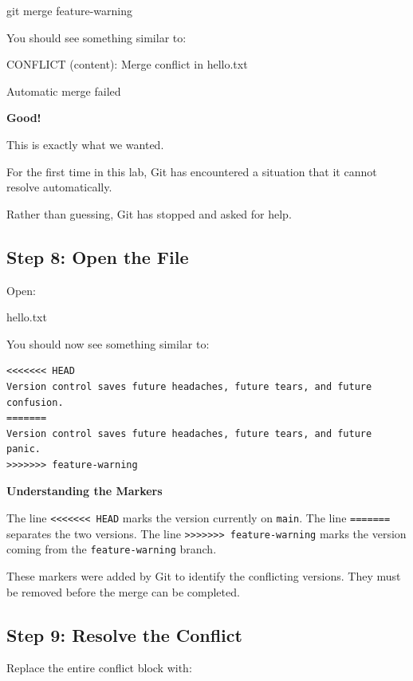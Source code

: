 \documentclass{csc2059practical}
\begin{document}
\begin{terminalplain}
git merge feature-warning
\end{terminalplain}
You should see something similar to:

\begin{terminalplain}
CONFLICT (content): Merge conflict in hello.txt
\end{terminalplain}
\begin{terminalplain}
Automatic merge failed
\end{terminalplain}
\begin{importantnote}
\textbf{Good!}\par
\medskip

This is exactly what we wanted.


For the first time in this lab, Git has encountered a situation that it cannot resolve automatically.


Rather than guessing, Git has stopped and asked for help.


\end{importantnote}
\subsection{Step 8: Open the File}
Open:

\begin{terminalplain}
hello.txt
\end{terminalplain}
You should now see something similar to:

\begin{verbatim}
<<<<<<< HEAD
Version control saves future headaches, future tears, and future confusion.
=======
Version control saves future headaches, future tears, and future panic.
>>>>>>> feature-warning
\end{verbatim}

\begin{importantnote}
\textbf{Understanding the Markers}\par
\medskip
The line \texttt{<<<<<<< HEAD} marks the version currently on \texttt{main}. The line \texttt{=======} separates the two versions. The line \texttt{>>>>>>> feature-warning} marks the version coming from the \texttt{feature-warning} branch.

These markers were added by Git to identify the conflicting versions. They must be removed before the merge can be completed.
\end{importantnote}

\subsection{Step 9: Resolve the Conflict}
Replace the entire conflict block with:
\end{document}
